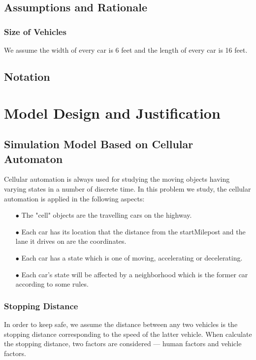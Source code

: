 \documentclass[a4paper]{article}
\begin{document}
	\subsection{Assumptions and Rationale}
	\subsubsection{Size of Vehicles}
	We assume the width of every car is 6 feet and the length of every car is 16 feet.

	\subsection{Notation}

	\section{Model Design and Justification}

	\subsection{Simulation Model Based on Cellular Automaton}
	Cellular automation is always used for studying the moving objects having varying states in a number of discrete time. In this problem we study, the cellular automation is applied in the following aspects:
	\begin{enumerate}
		\item[$ \bullet $] The "cell" objects are the travelling cars on the highway.
		\item[$ \bullet $] Each car has its location that the distance from the startMilepost and the lane it drives on are the coordinates.
		\item[$ \bullet $] Each car has a state which is one of moving, accelerating or decelerating.
		\item[$ \bullet $] Each car's state will be affected by a neighborhood which is the former car according to some rules.
	\end{enumerate}
	\subsubsection{Stopping Distance}
	In order to keep safe, we assume the distance between any two vehicles is the stopping distance corresponding to the speed of the latter vehicle. When calculate the stopping distance, two factors are considered — human factors and vehicle factors.
\end{document}
